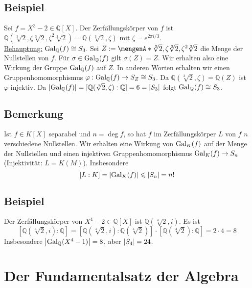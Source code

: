 \subsection[Beispiel einer Galois-Gruppe eines Polynoms]{Beispiel} %
\label{sub:1710}
Sei $f=X^3-2 \in \mathds{Q}[X]$. Der Zerfällungskörper von $f$ ist  $\mathds{Q}(\sqrt[3]{2}, \zeta \sqrt[3]{2}, \zeta^2 \sqrt[3]{2}) =\mathds{Q}(\sqrt[3]{2}, \zeta  )$ 
mit $\zeta= e^{2 \pi  i /3} $. \\
\uline{Behauptung:} $\Gal_\mathds{Q}(f) \cong S_3$.
Sei $Z := \set{\sqrt[3]{2}, \zeta \sqrt[3]{2}, \zeta^2 \sqrt[3]{2} } $ die Menge der Nullstellen von $f$. Für $\sigma \in \Gal_\mathds{Q}(f)$ gilt $\sigma(Z)=Z$. Wir 
erhalten also eine Wirkung der Gruppe $\Gal_\mathds{Q}(f)$ auf $Z$. In anderen Worten erhalten wir einen Gruppenhomomorphismus 
$\varphi : \Gal_\mathds{Q}(f) \to S_Z \cong S_3$. Da $\mathds{Q}(\sqrt[3]{2}, \zeta  ) = \mathds{Q}(Z)$ ist $\varphi$ injektiv. Da 
$\abs*{\Gal_\mathds{Q}(f)} =  [\mathds{Q}(\sqrt[3]{2}, \zeta  ): \mathds{Q}]=6 = \abs*{S_3} $ folgt $\Gal_Q(f)  \cong S_3$. \bewende

\subsection[Bemerkung: Die Galois-Gruppe wirkt auf der Menge der Nullstellen]{Bemerkung} %
\label{sub:1711}
Ist $f \in K[X]$ separabel und $n= \deg f$, so hat $f$ im Zerfällungskörper $L$ von $f$ $n$ verschiedene Nullstellen. Wir erhalten eine Wirkung von $\Gal_K(f)$ auf der 
Menge der Nullstellen und einen injektiven Gruppenhomomorphismus $\Gal_K(f) \to S_n$ (Injektivität: $L=K(M)$). Insbesondere 
\[
	[L:K] = \abs*{\Gal_K(f)} \le \abs*{S_n} = n!  
\]

\subsection[Beispiel zur Ungleichung in \ref{sub:1711}]{Beispiel} %
\label{sub:1712}
Der Zerfällungskörper von $X^4-2 \in \mathds{Q}[X]$ ist $\mathds{Q}(\sqrt[4]{2},i)$. Es ist 
\[
	\left[\mathds{Q}(\sqrt[4]{2},i) :\mathds{Q}\right] = \left[\mathds{Q}(\sqrt[4]{2},i) : \mathds{Q}(\sqrt[4]{2})\right] \cdot \left[\mathds{Q}(\sqrt[4]{2}) : \mathds{Q}\right] = 2 \cdot 4 = 8
\]
Insbesondere $\abs*{\Gal_\mathds{Q}(X^4-1)} = 8 $, aber $\abs*{S_4} = 24 $.
\newpage

\section{Der Fundamentalsatz der Algebra} %
\label{sec:18}

